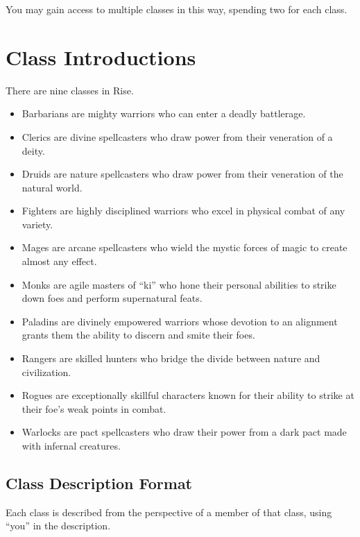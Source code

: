             You may gain access to multiple classes in this way, spending two  for each class.

\section{Class Introductions}

    There are nine classes in Rise.
    \begin{itemize}
        \item Barbarians are mighty warriors who can enter a deadly battlerage.
        \item Clerics are divine spellcasters who draw power from their veneration of a deity.
        \item Druids are nature spellcasters who draw power from their veneration of the natural world.
        \item Fighters are highly disciplined warriors who excel in physical combat of any variety.
        \item Mages are arcane spellcasters who wield the mystic forces of magic to create almost any effect.
        \item Monks are agile masters of ``ki'' who hone their personal abilities to strike down foes and perform supernatural feats.
        \item Paladins are divinely empowered warriors whose devotion to an alignment grants them the ability to discern and smite their foes.
        \item Rangers are skilled hunters who bridge the divide between nature and civilization.
        \item Rogues are exceptionally skillful characters known for their ability to strike at their foe's weak points in combat.
        \item Warlocks are pact spellcasters who draw their power from a dark pact made with infernal creatures.
    \end{itemize}

    \subsection{Class Description Format}
        Each class is described from the perspective of a member of that class, using ``you'' in the description.

